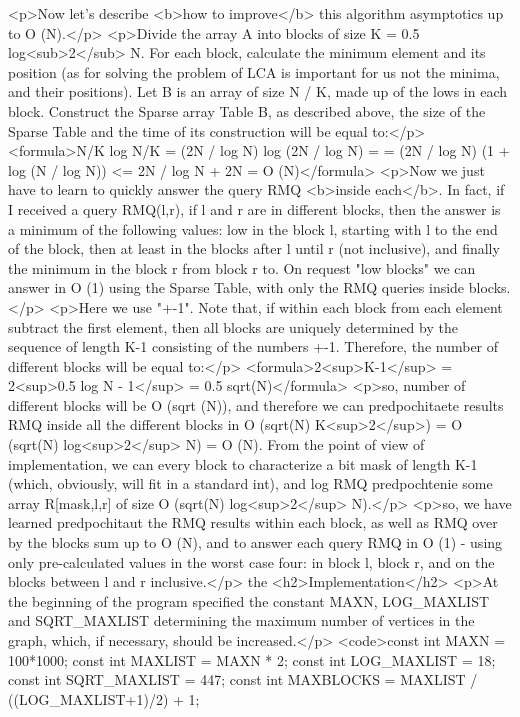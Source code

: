 <p>Now let's describe <b>how to improve</b> this algorithm asymptotics up to O (N).</p>
<p>Divide the array A into blocks of size K = 0.5 log<sub>2</sub> N. For each block, calculate the minimum element and its position (as for solving the problem of LCA is important for us not the minima, and their positions). Let B is an array of size N / K, made up of the lows in each block. Construct the Sparse array Table B, as described above, the size of the Sparse Table and the time of its construction will be equal to:</p>
<formula>N/K log N/K = (2N / log N) log (2N / log N) =
= (2N / log N) (1 + log (N / log N)) <= 2N / log N + 2N = O (N)</formula>
<p>Now we just have to learn to quickly answer the query RMQ <b>inside each</b>. In fact, if I received a query RMQ(l,r), if l and r are in different blocks, then the answer is a minimum of the following values: low in the block l, starting with l to the end of the block, then at least in the blocks after l until r (not inclusive), and finally the minimum in the block r from block r to. On request "low blocks" we can answer in O (1) using the Sparse Table, with only the RMQ queries inside blocks.</p>
<p>Here we use "+-1". Note that, if within each block from each element subtract the first element, then all blocks are uniquely determined by the sequence of length K-1 consisting of the numbers +-1. Therefore, the number of different blocks will be equal to:</p>
<formula>2<sup>K-1</sup> = 2<sup>0.5 log N - 1</sup> = 0.5 sqrt(N)</formula>
<p>so, number of different blocks will be O (sqrt (N)), and therefore we can predpochitaete results RMQ inside all the different blocks in O (sqrt(N) K<sup>2</sup>) = O (sqrt(N) log<sup>2</sup> N) = O (N). From the point of view of implementation, we can every block to characterize a bit mask of length K-1 (which, obviously, will fit in a standard int), and log RMQ predpochtenie some array R[mask,l,r] of size O (sqrt(N) log<sup>2</sup> N).</p>
<p>so, we have learned predpochitaut the RMQ results within each block, as well as RMQ over by the blocks sum up to O (N), and to answer each query RMQ in O (1) - using only pre-calculated values in the worst case four: in block l, block r, and on the blocks between l and r inclusive.</p>
the <h2>Implementation</h2>
<p>At the beginning of the program specified the constant MAXN, LOG_MAXLIST and SQRT_MAXLIST determining the maximum number of vertices in the graph, which, if necessary, should be increased.</p>
<code>const int MAXN = 100*1000;
const int MAXLIST = MAXN * 2;
const int LOG_MAXLIST = 18;
const int SQRT_MAXLIST = 447;
const int MAXBLOCKS = MAXLIST / ((LOG_MAXLIST+1)/2) + 1;

